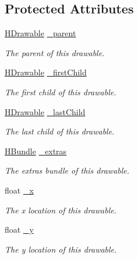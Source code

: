 \subsection*{Protected Attributes}
\begin{DoxyCompactItemize}
\item 
\hyperlink{classhype_1_1drawable_1_1_h_drawable}{H\-Drawable} \hyperlink{classhype_1_1drawable_1_1_h_drawable_a1f95d00444c6964efa4239ddf135a10e}{\-\_\-parent}
\begin{DoxyCompactList}\small\item\em The parent of this drawable. \end{DoxyCompactList}\item 
\hyperlink{classhype_1_1drawable_1_1_h_drawable}{H\-Drawable} \hyperlink{classhype_1_1drawable_1_1_h_drawable_a69d5c4b696ca07da01e245a88348962d}{\-\_\-first\-Child}
\begin{DoxyCompactList}\small\item\em The first child of this drawable. \end{DoxyCompactList}\item 
\hyperlink{classhype_1_1drawable_1_1_h_drawable}{H\-Drawable} \hyperlink{classhype_1_1drawable_1_1_h_drawable_a913a87558ada09b12cbe57fd88ecdd10}{\-\_\-last\-Child}
\begin{DoxyCompactList}\small\item\em The last child of this drawable. \end{DoxyCompactList}\item 
\hyperlink{classhype_1_1util_1_1_h_bundle}{H\-Bundle} \hyperlink{classhype_1_1drawable_1_1_h_drawable_a77a64d01b7766ad4d0e338f82ab23f12}{\-\_\-extras}
\begin{DoxyCompactList}\small\item\em The extras bundle of this drawable. \end{DoxyCompactList}\item 
float \hyperlink{classhype_1_1drawable_1_1_h_drawable_a20c0ae16de46b74c903667ac2db1640a}{\-\_\-x}
\begin{DoxyCompactList}\small\item\em The x location of this drawable. \end{DoxyCompactList}\item 
float \hyperlink{classhype_1_1drawable_1_1_h_drawable_a42f6ddcf3b67293eab4d61d08eccbd5c}{\-\_\-y}
\begin{DoxyCompactList}\small\item\em The y location of this drawable. \end{DoxyCompactList}\item 

\end{DoxyCompactItemize}
